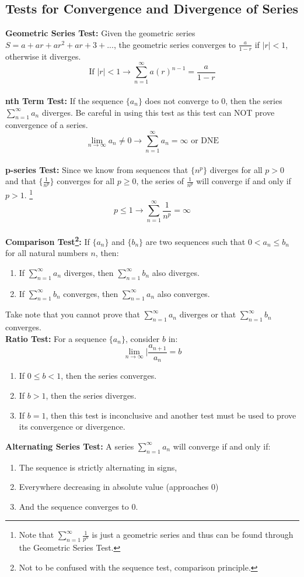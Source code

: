 \documentclass[12pt, letterpaper]{article}
\begin{document}
\subsection{Tests for Convergence and Divergence of Series}
\textbf{Geometric Series Test:} Given the geometric series $S = a+ar+ar^2+ar+3+...$, the geometric series converges to $\frac{a}{1-r}$ if $|r|<1$, otherwise it diverges. \[\text{If } |r|<1\rightarrow\sum_{n=1}^{\infty}a(r)^{n-1} = \frac{a}{1-r}\] \vspace{1em}\\
\textbf{nth Term Test:} If the sequence $\{a_n\}$ does not converge to 0, then the series $\sum_{n=1}^{\infty}a_n$ diverges. Be careful in using this test as this test can NOT prove convergence of a series. \[\lim_{n\rightarrow\infty}a_n\neq0 \rightarrow \sum_{n=1}^{\infty}a_n=\infty \text{ or DNE}\] \vspace{1em}\\
\textbf{p-series Test:} Since we know from sequences that $\{n^p\}$ diverges for all $p>0$ and that $\{\frac{1}{n^p}\}$ converges for all $p\geq0$, the series of $\frac{1}{n^p}$ will converge if and only if $p>1$. \footnote{Note that $\sum_{n=1}^{\infty}\frac{1}{p^n}$ is just a geometric series and thus can be found through the Geometric Series Test.}\[p\leq1\rightarrow\sum_{n=1}^{\infty}\frac{1}{n^p}=\infty\] \vspace{1em}\\
\textbf{Comparison Test\footnote{Not to be confused with the sequence test, comparison principle.}:} If $\{a_n\}$ and $\{b_n\}$ are two sequences such that $0<a_n\leq b_n$ for all natural numbers $n$, then:
\begin{enumerate}
    \item If $\sum_{n=1}^{\infty} a_n$ diverges, then $\sum_{n=1}^{\infty} b_n$ also diverges.
    \item If $\sum_{n=1}^{\infty} b_n$ converges, then $\sum_{n=1}^{\infty} a_n$ also converges.
\end{enumerate}
Take note that you cannot prove that $\sum_{n=1}^{\infty} a_n$ diverges or that $\sum_{n=1}^{\infty} b_n$ converges. \vspace{1em}\\
\textbf{Ratio Test:} For a sequence $\{a_n\}$, consider $b$ in: \[\lim_{n\rightarrow\infty}|\frac{a_{n+1}}{a_n}=b\]
\begin{enumerate}
    \item If $0\leq b<1$, then the series converges.
    \item If $b>1$, then the series diverges.
    \item If $b=1$, then this test is inconclusive and another test must be used to prove its convergence or divergence.
\end{enumerate} 
\textbf{Alternating Series Test:} A series $\sum_{n=1}^{\infty} a_n$ will converge if and only if:
\begin{enumerate}
    \item The sequence is strictly alternating in signs,
    \item Everywhere decreasing in absolute value (approaches 0)
    \item And the sequence converges to 0.
\end{enumerate}
\end{document}
